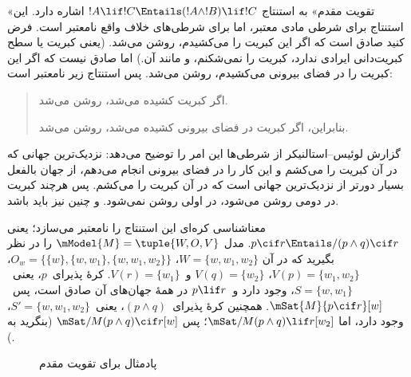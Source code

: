 \documentclass[../../../include/open-logic-section]{subfiles}
\begin{document}


«تقویت مقدم» به استنتاج
$!A \lif !C \Entails (!A \land !B) \lif !C$ اشاره دارد. این استنتاج
برای شرطی مادی معتبر، اما برای شرطی‌های خلاف واقع نامعتبر است. فرض کنید
صادق است که اگر این کبریت را می‌کشیدم، روشن می‌شد. (یعنی کبریت یا سطح
کبریت‌دانی ایرادی ندارد، کبریت را نمی‌شکنم، و مانند آن.) اما صادق نیست
که اگر این کبریت را در فضای بیرونی می‌کشیدم، روشن می‌شد. پس استنتاج زیر
نامعتبر است:
\begin{quote}
  اگر کبریت کشیده می‌شد، روشن می‌شد.

  بنابراین، اگر کبریت در فضای بیرونی کشیده می‌شد، روشن می‌شد.
\end{quote}

گزارش لوئیس--استالنیکر از شرطی‌ها این امر را توضیح می‌دهد: نزدیک‌ترین
جهانی که در آن کبریت را می‌کشم و این کار را در فضای بیرونی انجام می‌دهم،
از جهان بالفعل بسیار دورتر از نزدیک‌ترین جهانی است که در آن کبریت را
می‌کشم. پس هرچند کبریت در دومی روشن می‌شود، در اولی روشن نمی‌شود. و
چنین نیز باید باشد.

\begin{ex}
  معناشناسی کره‌ای این استنتاج را نامعتبر می‌سازد؛ یعنی
  $p \cif r \Entails/ (p \land q) \cif r$. مدل
  $\mModel{M} = \tuple{W, O, V}$ را در نظر بگیرید که در آن
  $W = \{w, w_1, w_2\}$،
  $O_w = \{\{w\}, \{w, w_1\}, \{w, w_1, w_2\}\}$،
  $V(p) = \{w_1, w_2\}$، $V(q) = \{w_2\}$ و~$V(r) = \{w_1\}$.
  کرهٔ پذیرای~$p$، یعنی~$S = \{w, w_1\}$، وجود دارد و~$p \lif r$ در
  همهٔ جهان‌های آن صادق است، پس~$\mSat{M}{p \cif r}[w]$. همچنین کرهٔ
  پذیرای~$(p \land q)$، یعنی~$S' = \{w, w_1, w_2\}$، وجود دارد، اما
  $\mSat/{M}{(p \land q) \lif r}[w_2]$؛ پس
  $\mSat/{M}{(p \land q) \cif r}[w]$ (بنگرید به
  ).

\begin{figure}
\begin{center}
\caption{پادمثال برای تقویت مقدم}
\end{center}
\end{figure}
\end{ex}
\end{document}
